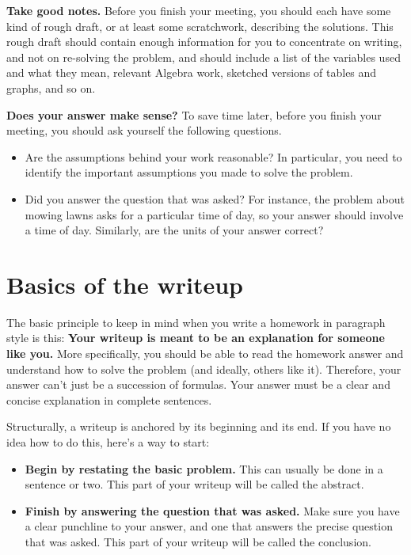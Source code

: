 \documentclass{article}
\begin{document}
\textbf{Take good notes.} Before you finish your meeting, you should each have some kind of rough draft, or at least some scratchwork, describing the solutions. This rough draft should contain enough information for you to concentrate on writing, and not on re-solving the problem, and should include a list of the variables used and what they mean, relevant Algebra work, sketched versions of tables and graphs, and so on.

\textbf{Does your answer make sense?} To save time later, before you finish your meeting, you should ask yourself the following questions.

\begin{itemize}

\item Are the assumptions behind your work reasonable? In particular, you need to identify the important assumptions you made to solve the problem.

\item Did you answer the question that was asked? For instance, the problem about mowing lawns asks for a particular time of day, so your answer should involve a time of day. Similarly, are the units of your answer correct?

\end{itemize}

\section*{Basics of the writeup}

The basic principle to keep in mind when you write a homework in paragraph style is this: \textbf{Your writeup is meant to be an explanation for someone like you.} More specifically, you should be able to read the homework answer and understand how to solve the problem (and ideally, others like it). Therefore, your answer can't just be a succession of formulas. Your answer must be a clear and concise explanation in complete sentences.

Structurally, a writeup is anchored by its beginning and its end. If you have no idea how to do this, here's a way to start:

\begin{itemize}

\item \textbf{Begin by restating the basic problem.} This can usually be done in a sentence or two. This part of your writeup will be called the abstract.

\item \textbf{Finish by answering the question that was asked.} Make sure you have a clear punchline to your answer, and one that answers the precise question that was asked. This part of your writeup will be called the conclusion.

\end{itemize}
\end{document}
